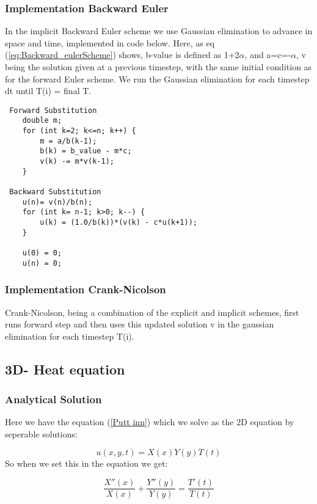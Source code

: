 \documentclass[a4paper,10pt]{article}
\begin{document}
\subsubsection{Implementation Backward Euler}
In the implicit Backward Euler scheme we use Gaussian elimination to advance in space and time, implemented in code below. Here, as eq (\ref{eq:Backward_eulerScheme}) shows, b-value is defined as
1+2$\alpha$, and a=c=-$\alpha$, v being the solution given at a previous timestep, with the same initial condition as for the forward Euler scheme. We run the Gaussian elimination for each timestep dt until T(i) = final T.

\begin{verbatim}
 Forward Substitution
    double m;
    for (int k=2; k<=n; k++) {
        m = a/b(k-1);
        b(k) = b_value - m*c;
        v(k) -= m*v(k-1);
    }

 Backward Substitution
    u(n)= v(n)/b(n);
    for (int k= n-1; k>0; k--) {
        u(k) = (1.0/b(k))*(v(k) - c*u(k+1));
    }

    u(0) = 0;
    u(n) = 0;
\end{verbatim}

\subsubsection{Implementation Crank-Nicolson}
Crank-Nicolson, being a combination of the explicit and implicit schemes, first runs forward step and then uses this updated solution v in the gaussian elimination for each timestep T(i).

\subsection{3D- Heat equation}
\subsubsection{Analytical Solution}
Here we have the equation (\ref{Putt inn}) which we solve as the 2D equation by seperable solutions:

\begin{equation}
 u(x,y,t) = X(x)Y(y)T(t)
\end{equation}
So when we set this in the equation we get:

\begin{equation}
 \frac{X''(x)}{X(x)} + \frac{Y''(y)}{Y(y)} = \frac{T'(t)}{T(t)} 
\end{equation}
\end{document}
